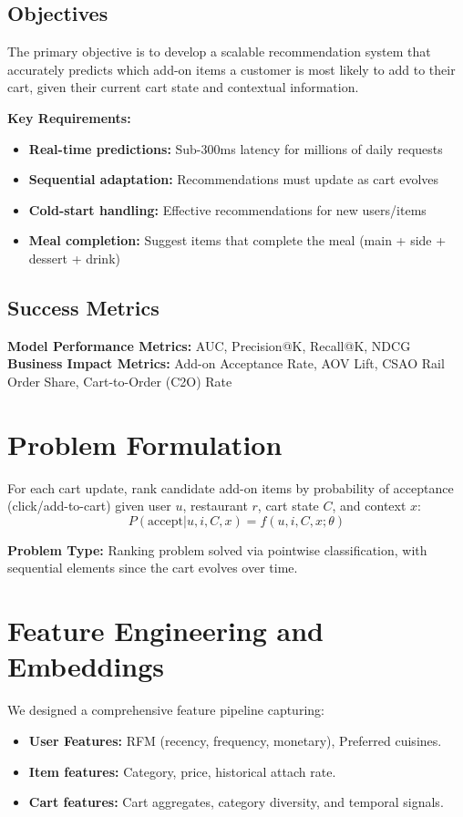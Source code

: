 \documentclass[12pt,a4paper]{article}
\begin{document}
\subsection{Objectives}
The primary objective is to develop a scalable recommendation system that accurately predicts which add-on items a customer is most likely to add to their cart, given their current cart state and contextual information.

\textbf{Key Requirements:}
\begin{itemize}
    \item \textbf{Real-time predictions:} Sub-300ms latency for millions of daily requests
    \item \textbf{Sequential adaptation:} Recommendations must update as cart evolves
    \item \textbf{Cold-start handling:} Effective recommendations for new users/items
    \item \textbf{Meal completion:} Suggest items that complete the meal (main + side + dessert + drink)
\end{itemize}

\subsection{Success Metrics}
\textbf{Model Performance Metrics:} AUC, Precision@K, Recall@K, NDCG \\
\textbf{Business Impact Metrics:} Add-on Acceptance Rate, AOV Lift, CSAO Rail Order Share, Cart-to-Order (C2O) Rate

\section{Problem Formulation}

\begin{tcolorbox}[colback=green!5!white,colframe=green!75!black,title=Task Definition]
For each cart update, rank candidate add-on items by probability of acceptance (click/add-to-cart) given user $u$, restaurant $r$, cart state $C$, and context $x$:
$$P(\text{accept} | u, i, C, x) = f(u, i, C, x; \theta)$$
\end{tcolorbox}

\textbf{Problem Type:} Ranking problem solved via pointwise classification, with sequential elements since the cart evolves over time.

\section{Feature Engineering and Embeddings}
We designed a comprehensive feature pipeline capturing:
\begin{itemize}
    \item \textbf{User Features:} RFM (recency, frequency, monetary), Preferred cuisines.
    \item \textbf{Item features:} Category, price, historical attach rate.
    \item \textbf{Cart features:} Cart aggregates, category diversity, and temporal signals.
\end{itemize}
\end{document}
